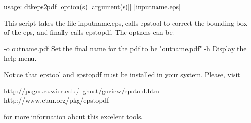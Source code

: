 
    usage: dtkeps2pdf [option(s) [argument(s)]] [inputname.eps]

This script takes the file inputname.eps, calls epstool to correct the bounding
box of the eps, and finally calls epstopdf. The options can be:

   -o outname.pdf   Set the final name for the pdf to be "outname.pdf"
   -h               Display the help menu.

Notice that epstool and epstopdf must be installed in your system. Please, visit

http://pages.cs.wisc.edu/~ghost/gsview/epstool.htm
http://www.ctan.org/pkg/epstopdf

for more information about this excelent tools.
